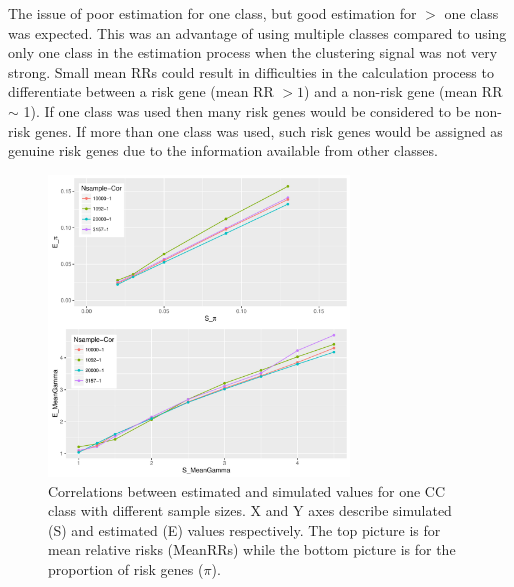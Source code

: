 \documentclass[]{article}
\begin{document}
The issue of poor estimation for one class, but good estimation
for $>$ one class was expected. This was an advantage of using
multiple classes compared to using only one class in the estimation
process when the clustering signal was not very strong.  Small mean RRs could result in difficulties in the calculation
process to differentiate between a risk gene (mean RR $> 1$) and a
non-risk gene (mean RR $\sim$ 1). If one class was used
then many risk genes would be considered to be non-risk genes. If more
than one class was used, such risk genes would be assigned as genuine
risk genes due to the information available from other classes.



\begin{figure}[ht]
\centering
\includegraphics[width=\textwidth,height=8cm]{Picture/PUBOnlyCCnSample.pdf}
\caption{Correlations between estimated and simulated values for one
  CC class with different sample sizes.  X and Y axes describe simulated (S) and estimated (E)
  values respectively. The top picture is for mean relative risks
  (MeanRRs) while the bottom picture is for the proportion of risk
  genes ($\pi$).}
\label{tab:CorrelationOneClassCC}
\end{figure}
\end{document}
